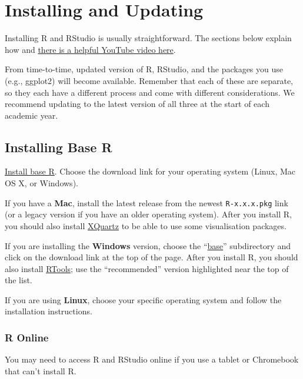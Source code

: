 \documentclass[
  oneside]{book}
\begin{document}
\hypertarget{appendix-appendices}{%
\appendix}


\hypertarget{installingr}{%
\chapter{Installing and Updating}\label{installingr}}

Installing R and RStudio is usually straightforward. The sections below explain how and \href{https://www.youtube.com/watch?v=lVKMsaWju8w}{there is a helpful YouTube video here}.

From time-to-time, updated version of R, RStudio, and the packages you use (e.g., ggplot2) will become available. Remember that each of these are separate, so they each have a different process and come with different considerations. We recommend updating to the latest version of all three at the start of each academic year.

\hypertarget{installing-base-r}{%
\section{Installing Base R}\label{installing-base-r}}

\href{https://cran.rstudio.com/}{Install base R}. Choose the download link for your operating system (Linux, Mac OS X, or Windows).

If you have a \textbf{Mac}, install the latest release from the newest \texttt{R-x.x.x.pkg} link (or a legacy version if you have an older operating system). After you install R, you should also install \href{http://xquartz.macosforge.org/}{XQuartz} to be able to use some visualisation packages.

If you are installing the \textbf{Windows} version, choose the ``\href{https://cran.rstudio.com/bin/windows/base/}{base}'' subdirectory and click on the download link at the top of the page. After you install R, you should also install \href{https://cran.rstudio.com/bin/windows/Rtools/}{RTools}; use the ``recommended'' version highlighted near the top of the list.

If you are using \textbf{Linux}, choose your specific operating system and follow the installation instructions.

\hypertarget{rstudio-online}{%
\subsection{R Online}\label{rstudio-online}}

You may need to access R and RStudio online if you use a tablet or Chromebook that can't install R.
\end{document}
